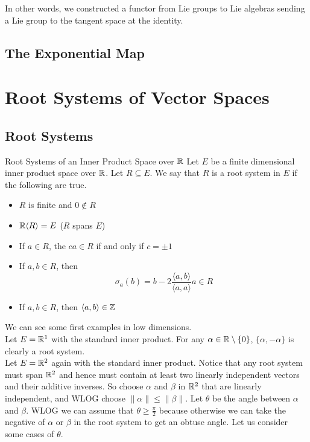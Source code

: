 \documentclass[a4paper]{article}
\begin{document}
In other words, we constructed a functor from Lie groups to Lie algebras sending a Lie group to the tangent space at the identity. 

\subsection{The Exponential Map}

\pagebreak
\section{Root Systems of Vector Spaces}
\subsection{Root Systems}
\begin{defn}{Root Systems of an Inner Product Space over $\mathbb{R}$}{} Let $E$ be a finite dimensional inner product space over $\mathbb{R}$. Let $R\subseteq E$. We say that $R$ is a root system in $E$ if the following are true. 
\begin{itemize}
\item $R$ is finite and $0\notin R$
\item $\mathbb{R}\langle R\rangle=E$ ($R$ spans $E$)
\item If $a\in R$, the $ca\in R$ if and only if $c=\pm1$
\item If $a,b\in R$, then $$\sigma_a(b)=b-2\frac{\langle a,b\rangle}{\langle a,a\rangle}a\in R$$
\item If $a,b\in R$, then $\langle a,b\rangle\in\mathbb{Z}$
\end{itemize}
\end{defn}

We can see some first examples in low dimensions. \\

Let $E=\mathbb{R}^1$ with the standard inner product. For any $\alpha\in\mathbb{R}\setminus\{0\}$, $\{\alpha,-\alpha\}$ is clearly a root system. \\

Let $E=\mathbb{R}^2$ again with the standard inner product. Notice that any root system must span $\mathbb{R}^2$ and hence must contain at least two linearly independent vectors and their additive inverses. So choose $\alpha$ and $\beta$ in $\mathbb{R}^2$ that are linearly independent, and WLOG choose $\|\alpha\|\leq\|\beta\|$. Let $\theta$ be the angle between $\alpha$ and $\beta$. WLOG we can assume that $\theta\geq\frac{\pi}{2}$ because otherwise we can take the negative of $\alpha$ or $\beta$ in the root system to get an obtuse angle. Let us consider some cases of $\theta$. 
\end{document}
